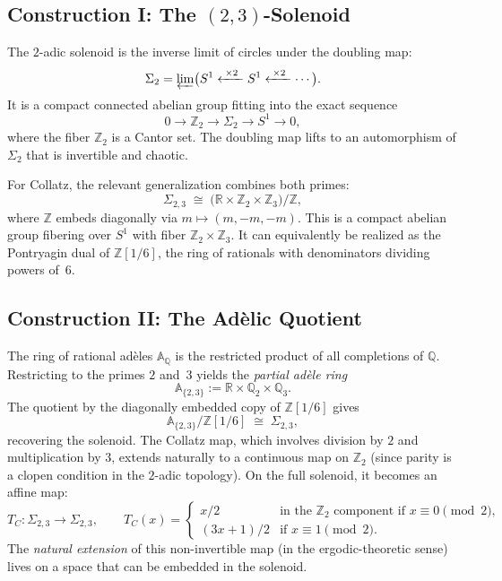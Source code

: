 \documentclass[11pt,a4paper]{article}
\newcommand{\Z}{\mathbb{Z}}
\newcommand{\R}{\mathbb{R}}
\newcommand{\Q}{\mathbb{Q}}
\newcommand{\A}{\mathbb{A}}
\theoremstyle{plain}
\theoremstyle{definition}
\begin{document}
\subsection{Construction I: The $(2,3)$-Solenoid}

The $2$-adic solenoid is the inverse limit of circles under the doubling map:
\begin{equation}\label{eq:2-solenoid}
    \Sigma_2 = \varprojlim\bigl( S^1 \xleftarrow{\;\times 2\;} S^1 \xleftarrow{\;\times 2\;} \cdots \bigr).
\end{equation}
It is a compact connected abelian group fitting into the exact sequence
\begin{equation}\label{eq:solenoid-ses}
    0 \to \Z_2 \to \Sigma_2 \to S^1 \to 0,
\end{equation}
where the fiber $\Z_2$ is a Cantor set. The doubling map lifts to an automorphism of $\Sigma_2$ that is invertible and chaotic.

For Collatz, the relevant generalization combines both primes:
\begin{equation}\label{eq:23-solenoid}
    \Sigma_{2,3} \;\cong\; \bigl(\R \times \Z_2 \times \Z_3\bigr) \big/ \Z,
\end{equation}
where $\Z$ embeds diagonally via $m \mapsto (m, -m, -m)$. This is a compact abelian group fibering over $S^1$ with fiber $\Z_2 \times \Z_3$. It can equivalently be realized as the Pontryagin dual of $\Z[1/6]$, the ring of rationals with denominators dividing powers of~$6$.


\subsection{Construction II: The Ad\`elic Quotient}

The ring of rational ad\`eles $\A_\Q$ is the restricted product of all completions of $\Q$. Restricting to the primes $2$ and~$3$ yields the \emph{partial ad\`ele ring}
\begin{equation}\label{eq:partial-adele}
    \A_{\{2,3\}} := \R \times \Q_2 \times \Q_3.
\end{equation}
The quotient by the diagonally embedded copy of $\Z[1/6]$ gives
\begin{equation}\label{eq:adelic-solenoid}
    \A_{\{2,3\}} \big/ \Z[1/6] \;\cong\; \Sigma_{2,3},
\end{equation}
recovering the solenoid. The Collatz map, which involves division by $2$ and multiplication by $3$, extends naturally to a continuous map on $\Z_2$ (since parity is a clopen condition in the $2$-adic topology). On the full solenoid, it becomes an affine map:
\begin{equation}\label{eq:collatz-affine}
    T_C: \Sigma_{2,3} \to \Sigma_{2,3}, \qquad
    T_C(x) = \begin{cases}
        x/2 & \text{in the $\Z_2$ component if $x \equiv 0 \pmod{2}$},\\
        (3x+1)/2 & \text{if $x \equiv 1 \pmod{2}$}.
    \end{cases}
\end{equation}
The \emph{natural extension} of this non-invertible map (in the ergodic-theoretic sense) lives on a space that can be embedded in the solenoid.
\end{document}
